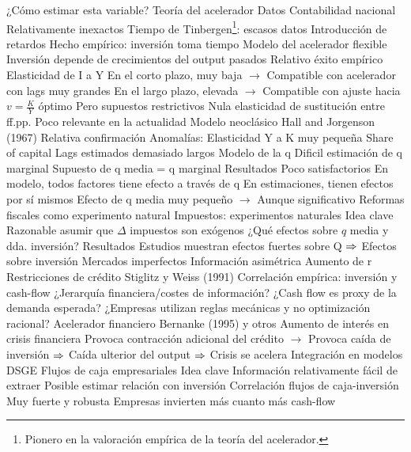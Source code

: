 \documentclass{nuevotema}
\begin{document}
\begin{esquemal}
				\4[] ¿Cómo estimar esta variable?
		\2 Teoría del acelerador
			\3 Datos
				\4 Contabilidad nacional
				\4 Relativamente inexactos
				\4 Tiempo de Tinbergen\footnote{Pionero en la valoración empírica de la teoría del acelerador.}: escasos datos
			\3 Introducción de retardos
				\4 Hecho empírico: inversión toma tiempo
				\4 Modelo del acelerador flexible
				\4[] Inversión depende de crecimientos del output pasados
			\3 Relativo éxito empírico
				\4 Elasticidad de I a Y
				\4[] En el corto plazo, muy baja
				\4[] $\to$ Compatible con acelerador con lags muy grandes
				\4[] En el largo plazo, elevada
				\4[] $\to$ Compatible con ajuste hacia $v=\frac{K}{Y}$ óptimo
				\4 Pero supuestos restrictivos
				\4[] Nula elasticidad de sustitución entre ff.pp.
				\4 Poco relevante en la actualidad
		\2 Modelo neoclásico
			\3 Hall and Jorgenson (1967)
				\4 Relativa confirmación
				\4 Anomalías:
				\4[] Elasticidad Y a K muy pequeña
				\4[] Share of capital
				\4[] Lags estimados demasiado largos
		\2 Modelo de la q
			\3 Dificil estimación de q marginal
				\4 Supuesto de q media = q marginal
			\3 Resultados
				\4 Poco satisfactorios
				\4 En modelo, todos factores tiene efecto a través de q
				\4 En estimaciones, tienen efectos por sí mismos
				\4 Efecto de q media muy pequeño
				\4[] $\to$ Aunque significativo
				\4 Reformas fiscales como experimento natural
		\2 Impuestos: experimentos naturales
			\3 Idea clave
				\4 Razonable asumir que $\Delta$ impuestos son exógenos
				\4 ¿Qué efectos sobre $q$ media y dda. inversión?
			\3 Resultados
				\4 Estudios muestran efectos fuertes sobre Q
				\4[] $\Rightarrow$ Efectos sobre inversión
		\2 Mercados imperfectos
			\3 Información asimétrica
				\4 Aumento de r
				\4 Restricciones de crédito
				\4[] Stiglitz y Weiss (1991)
			\3 Correlación empírica: inversión y cash-flow
				\4 ¿Jerarquía financiera/costes de información?
				\4 ¿Cash flow es proxy de la demanda esperada?
				\4 ¿Empresas utilizan reglas mecánicas y no optimización racional?
			\3 Acelerador financiero
				\4 Bernanke (1995) y otros
				\4 Aumento de interés en crisis financiera
				\4[] Provoca contracción adicional del crédito
				\4[] $\to$ Provoca caída de inversión
				\4[] $\Rightarrow$ Caída ulterior del output
				\4[] $\Rightarrow$ Crisis se acelera
				\4 Integración en modelos DSGE
		\2 Flujos de caja empresariales
			\3 Idea clave
				\4 Información relativamente fácil de extraer
				\4 Posible estimar relación con inversión
			\3 Correlación flujos de caja-inversión
				\4 Muy fuerte y robusta
				\4 Empresas invierten más cuanto más cash-flow

\end{esquemal}
\end{document}

